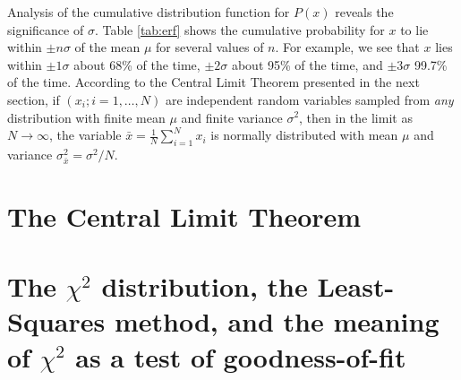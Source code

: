 \documentclass{revtex4}
\begin{document}
Analysis of the cumulative distribution function for $P(x)$ reveals the significance of $\sigma$. Table \ref{tab:erf} shows the cumulative probability for $x$ to lie within $\pm n\sigma$ of the mean $\mu$ for several values of $n$. For example, we see that $x$ lies within $\pm 1\sigma$ about 68\% of the time, $\pm 2\sigma$ about 95\% of the time, and $\pm 3\sigma$ 99.7\% of the time. According to the Central Limit Theorem presented in the next section, if $(x_i; i=1,\ldots,N)$ are
independent random variables sampled from \emph{any} distribution with finite mean $\mu$ and finite
variance $\sigma^2$, then in the limit as $N \rightarrow \infty$, the
variable $\bar{x} = \frac{1}{N} \sum_{i=1}^N x_i$ is normally
distributed with mean $\mu$ and variance $\sigma_{\bar{x}}^2 =
\sigma^2/N$. 

\section{The Central Limit Theorem}
\section{The $\chi^2$ distribution, the Least-Squares method, and the
  meaning of $\chi^2$ as a test of goodness-of-fit}
\end{document}
